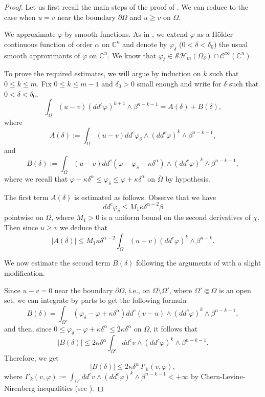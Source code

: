 \documentclass[11pt]{article}
\newcommand{\ie}{i.e.,\xspace}
\providecommand{\C}{}
\numberwithin{equation}{section}
\theoremstyle{definition}
\renewcommand{\C}{\mathbb{C}}
\theoremstyle{plain}
\theoremstyle{definition}
\begin{document}
\begin{proof}
Let us first recall the main steps of the proof of \cite[Lem.\,4.2]{BZ20}.
We can reduce to the case when $u = v$ near the boundary $\partial \Omega$ and $u \geq v$ on $\Omega$.

We approximate $\varphi$ by smooth functions. As in \cite{BZ20}, we extend $\varphi$ as a Hölder continuous function of order $\alpha$ on $\C^n$ and denote by $\varphi_{\delta}$ ($0 < \delta < \delta_0$) the usual smooth approximants of $\varphi $ on $\C^n$.
We know that $\varphi_\delta \in \mathcal{SH}_m (\Omega_{\delta})\cap\mathcal{C}^{\infty}(\mathbb C^n)$.

To prove the required estimates, we will argue by induction on $k$ such that \hbox{$0\!\leq\!k\!\leq\!m$}. Fix $0 \leq k \leq m-1$ and $\delta_0 > 0$ small enough and write for $\delta$ such that $0 < \delta < \delta_0$,
\[
\int_{\Omega}(u-v) (dd^c\varphi)^{k+1} \wedge\beta^{n-k-1} = A (\delta) + B (\delta),
\]
where
\[
A (\delta):=\int_{\Omega}(u-v)dd^c \varphi_{\delta}\wedge(dd^c\varphi)^k\wedge\beta^{n-k-1},
\]
and
\[
B (\delta) := \int_{\Omega}(u-v) dd^c(\varphi - \varphi_{\delta} - \kappa \delta^\alpha)\wedge(dd^c\varphi)^k\wedge\beta^{n-k-1},
\]
where we recall that $ \varphi - \kappa \delta^\alpha \leq \varphi_\delta \leq \varphi + \kappa \delta^\alpha$ on $\bar{\Omega}$ by hypothesis.

The first term $A (\delta)$ is estimated as follows. Observe that we have
\[
dd^c \varphi_\delta \leq M_1 \kappa \delta^{\alpha -2} \beta
\]
pointwise on $\Omega$, where $M_1 > 0$ is a uniform bound on the second derivatives of $\chi$. Then since $u \geq v$ we deduce that
\begin{equation} \label{eq:estimationA}
\vert A (\delta) \vert \leq M_1 \kappa \delta^{\alpha -2} \int_{\Omega} (u-v) (dd^c \varphi)^k \wedge \beta^{n-k}.
\end{equation}

We now estimate the second term $B (\delta)$ following the arguments of \cite[Lem.\,4.2]{BZ20} with a slight modification.

Since $ u - v = 0$ near the boundary $\partial \Omega$, \ie on $\Omega \setminus \Omega'$, where $\Omega' \Subset \Omega$ is an open set, we can integrate by parts to get the following formula
\[
B (\delta) = \int_{\Omega'} (\varphi_{\delta} - \varphi + \kappa \delta^\alpha) dd^c (v-u) \wedge(dd^c\varphi)^k\wedge\beta^{n-k-1},
\]
and then, since $0 \leq \varphi_{\delta}-\varphi + \kappa \delta^\alpha \leq 2 \kappa \delta^{\alpha}$ on $\Omega$, it follows that
\[
\vert B (\delta)\vert \leq 2 \kappa \delta^{\alpha} \int_{\Omega'} dd^c v \wedge(dd^c\varphi)^k\wedge\beta^{n-k-1}.
\]
Therefore, we get
\begin{equation} \label{eq:estimationB}
|B (\delta)| \leq 2 \kappa \delta^{\alpha} \, I'_k(v,\varphi),
\end{equation}
where $I'_k (v,\varphi) := \int_{\Omega'} dd^c v \wedge(dd^c\varphi)^k\wedge\beta^{n-k-1} < + \infty$ by Chern-Levine-Nirenberg inequalities (see \cite{Lu12}).


\end{proof}
\end{document}
